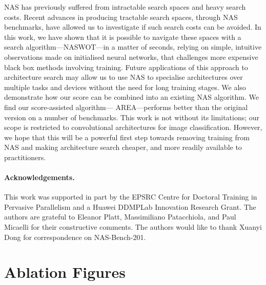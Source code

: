 \documentclass{article}
\begin{document}
NAS has previously suffered from intractable search spaces and heavy search costs. Recent advances in producing tractable search spaces, through NAS benchmarks, have allowed us to investigate if such search costs can be avoided. In this work, we have shown that it is possible to navigate these spaces with a search algorithm---NASWOT---in a matter of seconds, relying on simple, intuitive observations made on initialised neural networks, that challenges more expensive black box methods involving training. Future applications of this approach to architecture search may allow us to use NAS to specialise architectures over multiple tasks and devices without the need for long training stages.
We also demonstrate how our score can be combined into an existing NAS algorithm. We find our score-assisted algorithm--- AREA---performs better than the original version on a number of benchmarks. 
This work is not without its limitations; our scope is restricted to convolutional architectures for image classification. However, we hope that this will be a powerful first step towards removing training from NAS and making architecture search cheaper, and more readily available to practitioners.



\paragraph{Acknowledgements.} This work was supported in part by the EPSRC Centre for Doctoral Training in Pervasive Parallelism and a Huawei DDMPLab Innovation Research Grant. The authors are grateful to Eleanor Platt, Massimiliano Patacchiola, and Paul Micaelli for their constructive comments. The authors would like to thank Xuanyi Dong for correspondence on NAS-Bench-201.






\clearpage 
\appendix

\section{Ablation Figures}
\label{appendix:ablate}
\end{document}
